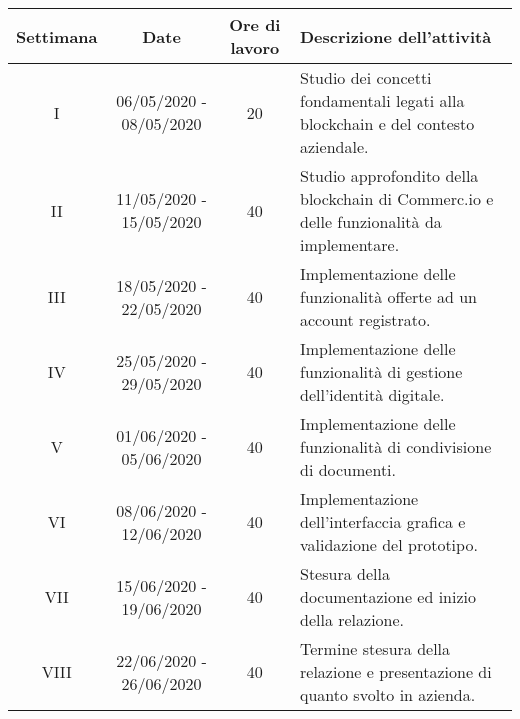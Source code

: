 
\begin{tabularx}{\textwidth}{|c|c|c|p{7.85cm}|}
	\hline
	\textbf{Settimana} & \textbf{Date} & \textbf{Ore di lavoro} & \textbf{Descrizione dell'attività} \\\hline
	I & 06/05/2020 - 08/05/2020 & 20 & Studio dei concetti fondamentali legati alla blockchain e del contesto aziendale. \\\hline
	II & 11/05/2020 - 15/05/2020 & 40 & Studio approfondito della blockchain di Commerc.io e delle funzionalità da implementare. \\\hline
	III & 18/05/2020 - 22/05/2020 & 40 & Implementazione delle funzionalità offerte ad un account registrato. \\\hline
	IV & 25/05/2020 - 29/05/2020 & 40 & Implementazione delle funzionalità di gestione dell'identità digitale. \\\hline
	V & 01/06/2020 - 05/06/2020 & 40 & Implementazione delle funzionalità di condivisione di documenti. \\\hline
	VI & 08/06/2020 - 12/06/2020 & 40 & Implementazione dell'interfaccia grafica e validazione del prototipo. \\\hline
	VII & 15/06/2020 - 19/06/2020 & 40 & Stesura della documentazione ed inizio della relazione. \\\hline
	VIII & 22/06/2020 - 26/06/2020 & 40 & Termine stesura della relazione e presentazione di quanto svolto in azienda. \\\hline
\end{tabularx}
